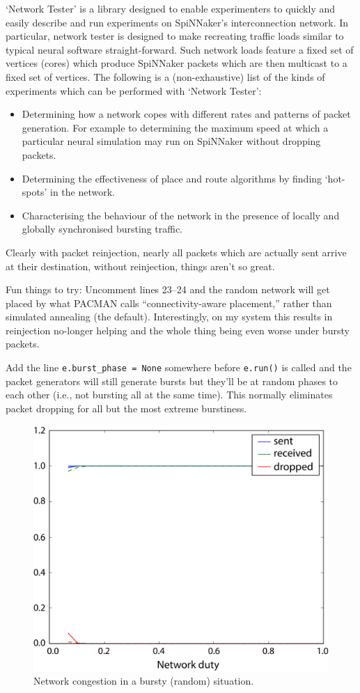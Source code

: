 \documentclass[a4paper, 11pt]{article}
\newlength\drop
\begin{document}
`Network Tester' is a library designed to enable experimenters to quickly and easily describe and run experiments on SpiNNaker's interconnection network. In particular, network tester is designed to make recreating traffic loads similar to typical neural software straight-forward. Such network loads feature a fixed set of vertices (cores) which produce SpiNNaker packets which are then multicast to a fixed set of vertices.
The following is a (non-exhaustive) list of the kinds of experiments which can be performed with `Network Tester':
\begin{itemize}
\item Determining how a network copes with different rates and patterns of packet generation. For example to determining the maximum speed at which a particular neural simulation may run on SpiNNaker without dropping
packets.
\item Determining the effectiveness of place and route algorithms by finding `hot-spots' in the network.
\item Characterising the behaviour of the network in the presence of locally and globally synchronised bursting traffic.
\end{itemize}

Clearly with packet reinjection, nearly all packets which are actually sent arrive at their destination, without reinjection, things aren't so great.

Fun things to try: Uncomment lines 23--24 and the random network will get placed by what PACMAN calls ``connectivity-aware placement,'' rather than simulated annealing (the default). Interestingly, on my system this results in reinjection no-longer helping and the whole thing being even worse under bursty packets.

Add the line \verb|e.burst_phase = None| somewhere before \verb|e.run()| is called and the packet generators will still generate bursts but they'll be at random phases to each other (i.e., not bursting all at the same time). This normally eliminates packet dropping for all but the most extreme burstiness.

\begin{figure}[htbp]
	\centering
	\includegraphics[width=0.5\linewidth]{images/bursting_random.pdf}
	\caption{Network congestion in a bursty (random) situation.}	
	\label{fig:bursting_random}
\end{figure}
\end{document}
